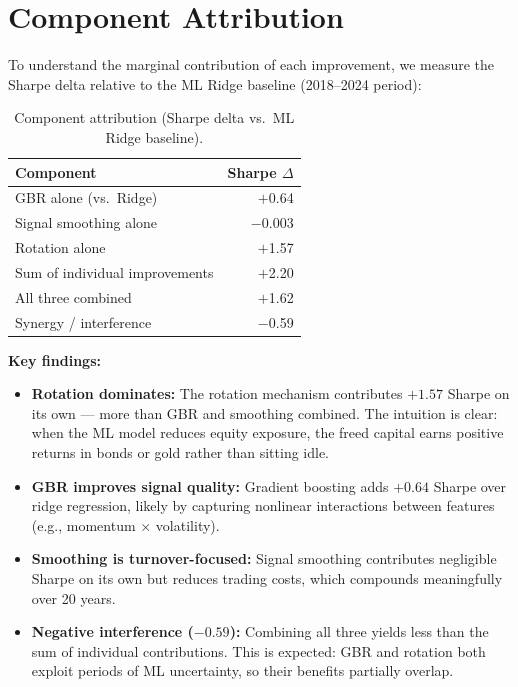 \documentclass[11pt, a4paper]{article}
\begin{document}
\section{Component Attribution}

To understand the marginal contribution of each improvement, we measure the Sharpe delta relative to the ML Ridge baseline (2018--2024 period):

\begin{table}[H]
\centering
\caption{Component attribution (Sharpe delta vs.\ ML Ridge baseline).}
\label{tab:attribution}
\begin{tabular}{lr}
\toprule
\textbf{Component} & \textbf{Sharpe $\Delta$} \\
\midrule
GBR alone (vs.\ Ridge)          & $+$0.64 \\
Signal smoothing alone          & $-$0.003 \\
Rotation alone                  & $+$1.57 \\
\midrule
Sum of individual improvements  & $+$2.20 \\
All three combined              & $+$1.62 \\
\midrule
Synergy / interference          & $-$0.59 \\
\bottomrule
\end{tabular}
\end{table}

\textbf{Key findings:}
\begin{itemize}[nosep]
    \item \textbf{Rotation dominates:} The rotation mechanism contributes $+1.57$ Sharpe on its own --- more than GBR and smoothing combined. The intuition is clear: when the ML model reduces equity exposure, the freed capital earns positive returns in bonds or gold rather than sitting idle.
    \item \textbf{GBR improves signal quality:} Gradient boosting adds $+0.64$ Sharpe over ridge regression, likely by capturing nonlinear interactions between features (e.g., momentum $\times$ volatility).
    \item \textbf{Smoothing is turnover-focused:} Signal smoothing contributes negligible Sharpe on its own but reduces trading costs, which compounds meaningfully over 20 years.
    \item \textbf{Negative interference ($-0.59$):} Combining all three yields less than the sum of individual contributions. This is expected: GBR and rotation both exploit periods of ML uncertainty, so their benefits partially overlap.
\end{itemize}
\end{document}
